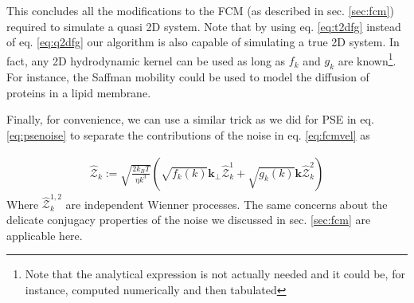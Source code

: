 \documentclass[ twoside,openright,titlepage,numbers=noenddot,%
headinclude,footinclude,cleardoublepage=empty,abstract=on,
BCOR=5mm,paper=a4,fontsize=11pt, dvipsnames
]{scrreprt}
\renewcommand{\vec}[1]{\bm{#1}}
\newcommand{\tens}[1]{\bm{\mathcal{#1}}}
\newcommand{\kT}{k_B T}
\newcommand{\half}{\frac{1}{2}}
\newcommand{\fou}[1]{\widehat{#1}}
\begin{document}
This concludes all the modifications to the \gls{FCM} (as described in sec. \ref{sec:fcm}) required to simulate a quasi 2D system. Note that by using eq. \eqref{eq:t2dfg} instead of eq. \eqref{eq:q2dfg} our algorithm is also capable of simulating a true 2D system. In fact, any 2D hydrodynamic kernel can be used as long as $f_k$ and $g_k$ are known\footnote{Note that the analytical expression is not actually needed and it could be, for instance, computed numerically and then tabulated}. For instance, the Saffman mobility could be used to model the diffusion of proteins in a lipid membrane\cite{Saffman}.

Finally, for convenience, we can use a similar trick as we did for \gls{PSE} in eq. \eqref{eq:psenoise} to separate the contributions of the noise in eq. \eqref{eq:fcmvel} as

\begin{equation}
  \begin{aligned}
    \fou{\tens{Z}}_k := \sqrt{\frac{2\kT}{\eta k^3}}\left(\sqrt{f_k(k)}\vec{k}_\perp\fou{\tens{Z}}^1_k + \sqrt{g_k(k)}\vec{k}\fou{\tens{Z}}^2_k\right)
  \end{aligned}
\end{equation}
Where $\fou{\tens{Z}}^{1,2}_k$ are independent Wienner processes. The same concerns about the delicate conjugacy properties of the noise we discussed in sec. \ref{sec:fcm} are applicable here.
\end{document}
